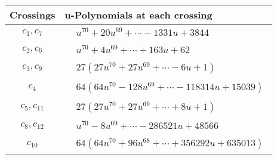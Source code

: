 \documentclass[1p]{elsarticle_modified}
\theoremstyle{definition}
\begin{document}
\begin{tabular}{m{50pt}|m{274pt}}
Crossings & \hspace{64pt}u-Polynomials at each crossing \\
\hline $$\begin{aligned}c_{1},c_{7}\end{aligned}$$&$\begin{aligned}
&u^{70}+20 u^{69}+\cdots-1331 u+3844
\end{aligned}$\\
\hline $$\begin{aligned}c_{2},c_{6}\end{aligned}$$&$\begin{aligned}
&u^{70}+4 u^{69}+\cdots+163 u+62
\end{aligned}$\\
\hline $$\begin{aligned}c_{3},c_{9}\end{aligned}$$&$\begin{aligned}
&27(27 u^{70}+27 u^{69}+\cdots-6 u+1)
\end{aligned}$\\
\hline $$\begin{aligned}c_{4}\end{aligned}$$&$\begin{aligned}
&64(64 u^{70}-128 u^{69}+\cdots-118314 u+15039)
\end{aligned}$\\
\hline $$\begin{aligned}c_{5},c_{11}\end{aligned}$$&$\begin{aligned}
&27(27 u^{70}+27 u^{69}+\cdots+8 u+1)
\end{aligned}$\\
\hline $$\begin{aligned}c_{8},c_{12}\end{aligned}$$&$\begin{aligned}
&u^{70}-8 u^{69}+\cdots-286521 u+48566
\end{aligned}$\\
\hline $$\begin{aligned}c_{10}\end{aligned}$$&$\begin{aligned}
&64(64 u^{70}+96 u^{68}+\cdots+356292 u+635013)
\end{aligned}$\\
\hline
\end{tabular}\\~\\
\end{document}
